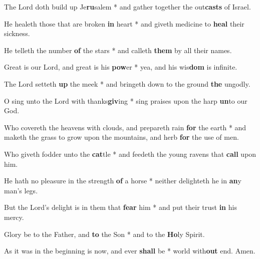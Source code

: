\begin{multicols}{2}
	The Lord doth build up Je\textbf{ru}salem * and gather together the out\textbf{casts} of Israel.
	
	He healeth those that are broken \textbf{in} heart * and giveth medicine to \textbf{heal} their sickness.
	
	He telleth the number \textbf{of} the stars * and calleth \textbf{them} by all their names.
	
	Great is our Lord, and great is his \textbf{pow}er * yea, and his wis\textbf{dom} is infinite.
	
	The Lord setteth \textbf{up} the meek * and bringeth down to the ground \textbf{the} ungodly.
	
	O sing unto the Lord with thanks\textbf{giv}ing * sing praises upon the harp \textbf{un}to our God.
	
	Who covereth the heavens with clouds, and prepareth rain \textbf{for} the earth * and maketh the grass to grow upon the mountains, and herb \textbf{for} the use of men.
	
	Who giveth fodder unto the \textbf{cat}tle * and feedeth the young ravens that \textbf{call} upon him.
	
	He hath no pleasure in the strength \textbf{of} a horse * neither delighteth he in \textbf{an}y man's legs.
	
	But the Lord's delight is in them that \textbf{fear} him * and put their trust \textbf{in} his mercy.
	
	Glory be to the Father, and \textbf{to} the Son * and to the \textbf{Ho}ly Spirit.
	
	As it was in the beginning is now, and ever \textbf{shall} be * world with\textbf{out} end. Amen.
\end{multicols}